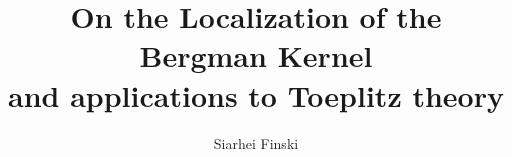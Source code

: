 \documentclass[12pt]{article}
\title{\vspace*{-1.5cm} On the Localization of the Bergman Kernel
\\
and applications to Toeplitz theory}
\author
{Siarhei Finski
}
\date{}
\numberwithin{equation}{section}
\theoremstyle{theorem}
\theoremstyle{definition}
\theoremstyle{remark}
\newenvironment{sciabstract}{}
\begin{document}
 


\maketitle 

\vspace*{-0.7cm}



\vspace*{0.3cm}

\begin{sciabstract}
  \textbf{Abstract.} 
	For a compact complex manifold endowed with a big line bundle and a Radon measure, we study the localization phenomena of the associated Bergman (or Christoffel-Darboux) kernel. 
	For Bernstein-Markov measures, this results in the determination of the limiting off-diagonal Bergman measure, thereby confirming a conjecture of Zelditch. 
	We then turn to applications in the theory of Toeplitz operators, showing in particular that they form an algebra under composition.
	Building on this, we then show that for Bernstein-Markov measures, the spectrum of Toeplitz operators equidistributes.
\end{sciabstract}

\pagestyle{fancy}
\lhead{}
\rhead{\thepage}
\cfoot{}


\newcommand{\Addresses}{{%
  \bigskip
  \footnotesize
  \noindent \textsc{Siarhei Finski, CNRS-CMLS, École Polytechnique F-91128 Palaiseau Cedex, France.}\par\nopagebreak
  \noindent  \textit{E-mail }: \texttt{finski.siarhei@gmail.com}.
}} 

\vspace*{0.25cm}

\par\noindent\rule{1.25em}{0.4pt} \textbf{Table of contents} \hrulefill


\vspace*{-1.5cm}

\tableofcontents

\vspace*{-0.2cm}
\end{document}
